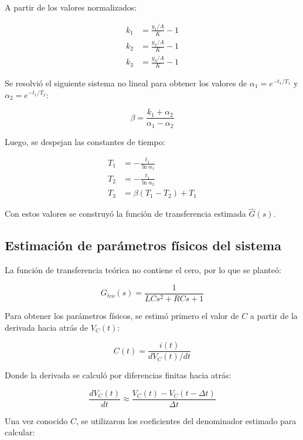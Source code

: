 \documentclass{article}
\begin{document}
A partir de los valores normalizados:

\begin{align}
k_1 &= \frac{y_1 / A}{K} - 1 \\
k_2 &= \frac{y_2 / A}{K} - 1 \\
k_3 &= \frac{y_3 / A}{K} - 1
\end{align}

Se resolvió el siguiente sistema no lineal para obtener los valores de $\alpha_1 = e^{-t_1/T_1}$ y $\alpha_2 = e^{-t_1/T_2}$:

\begin{equation}
\beta = \frac{k_1 + \alpha_2}{\alpha_1 - \alpha_2}
\end{equation}

Luego, se despejan las constantes de tiempo:

\begin{align}
T_1 &= -\frac{t_1}{\ln \alpha_1} \\
T_2 &= -\frac{t_1}{\ln \alpha_2} \\
T_3 &= \beta(T_1 - T_2) + T_1
\end{align}

Con estos valores se construyó la función de transferencia estimada $\hat{G}(s)$.

\subsection*{Estimación de parámetros físicos del sistema}
La función de transferencia teórica no contiene el cero, por lo que se planteó:

\begin{equation}
G_{teo}(s) = \frac{1}{LC s^2 + RC s + 1}
\end{equation}

Para obtener los parámetros físicos, se estimó primero el valor de $C$ a partir de la derivada hacia atrás de $V_C(t)$:

\begin{equation}
C(t) = \frac{i(t)}{dV_C(t)/dt}
\end{equation}

Donde la derivada se calculó por diferencias finitas hacia atrás:

\begin{equation}
\frac{dV_C(t)}{dt} \approx \frac{V_C(t) - V_C(t - \Delta t)}{\Delta t}
\end{equation}

Una vez conocido $C$, se utilizaron los coeficientes del denominador estimado para calcular:
\end{document}
